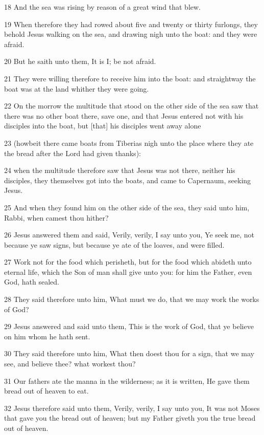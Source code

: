 \par 18 And the sea was rising by reason of a great wind that blew.
\par 19 When therefore they had rowed about five and twenty or thirty furlongs, they behold Jesus walking on the sea, and drawing nigh unto the boat: and they were afraid.
\par 20 But he saith unto them, It is I; be not afraid.
\par 21 They were willing therefore to receive him into the boat: and straightway the boat was at the land whither they were going.
\par 22 On the morrow the multitude that stood on the other side of the sea saw that there was no other boat there, save one, and that Jesus entered not with his disciples into the boat, but [that] his disciples went away alone
\par 23 (howbeit there came boats from Tiberias nigh unto the place where they ate the bread after the Lord had given thanks):
\par 24 when the multitude therefore saw that Jesus was not there, neither his disciples, they themselves got into the boats, and came to Capernaum, seeking Jesus.
\par 25 And when they found him on the other side of the sea, they said unto him, Rabbi, when camest thou hither?
\par 26 Jesus answered them and said, Verily, verily, I say unto you, Ye seek me, not because ye saw signs, but because ye ate of the loaves, and were filled.
\par 27 Work not for the food which perisheth, but for the food which abideth unto eternal life, which the Son of man shall give unto you: for him the Father, even God, hath sealed.
\par 28 They said therefore unto him, What must we do, that we may work the works of God?
\par 29 Jesus answered and said unto them, This is the work of God, that ye believe on him whom he hath sent.
\par 30 They said therefore unto him, What then doest thou for a sign, that we may see, and believe thee? what workest thou?
\par 31 Our fathers ate the manna in the wilderness; as it is written, He gave them bread out of heaven to eat.
\par 32 Jesus therefore said unto them, Verily, verily, I say unto you, It was not Moses that gave you the bread out of heaven; but my Father giveth you the true bread out of heaven.
